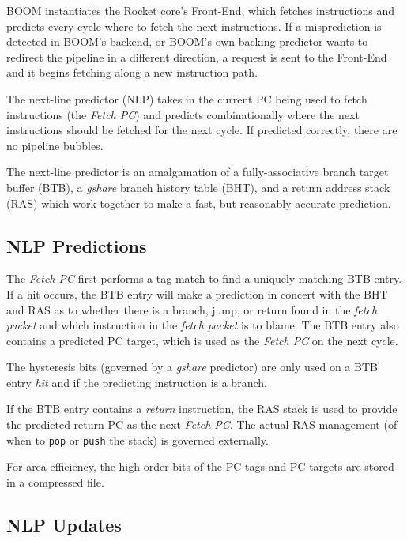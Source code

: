 BOOM instantiates the Rocket core's Front-End, which fetches instructions and predicts every cycle where to fetch the next instructions. If a misprediction is detected in BOOM's backend, or BOOM's own backing predictor wants to redirect the pipeline in a different direction, a request is sent to the Front-End and it begins fetching along a new instruction path. 

The next-line predictor (NLP) takes in the current PC being used to fetch instructions (the {\em Fetch PC}) and predicts combinationally where the next instructions should be fetched for the next cycle. If predicted correctly, there are no pipeline bubbles. 

The next-line predictor is an amalgamation of a fully-associative branch target buffer (BTB), a {\em gshare} branch history table (BHT), and a return address stack (RAS) which work together to make a fast, but reasonably accurate prediction.

\subsection{NLP Predictions}

The {\em Fetch PC} first performs a tag match to find a uniquely matching BTB entry.  
If a hit occurs, the BTB entry will make a prediction in concert with the BHT and RAS as to whether there is a branch, jump, or return found in the {\em fetch packet} and which instruction in the {\em fetch packet} is to blame.  
The BTB entry also contains a predicted PC target, which is used as the {\em Fetch PC} on the next cycle.



The hysteresis bits (governed by a {\em gshare} predictor) are only used on a BTB entry {\em hit} and if the predicting instruction is a branch.

If the BTB entry contains a {\em return} instruction, the RAS stack is used to provide the predicted return PC as the next {\em Fetch PC}. The actual RAS management (of when to {\tt {pop}} or {\tt {push}} the stack) is governed externally. 

For area-efficiency, the high-order bits of the PC tags and PC targets are stored in a compressed file.


\subsection{NLP Updates}

